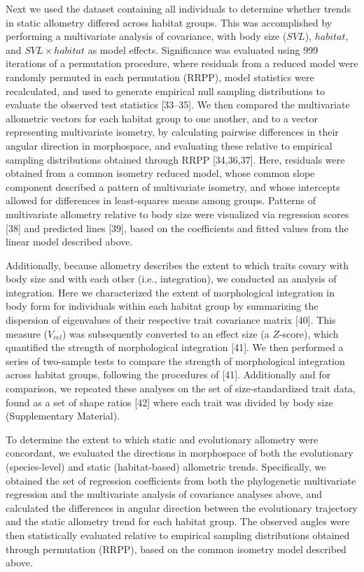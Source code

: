 \documentclass[
  11pt,
]{article}
\begin{document}
Next we used the dataset containing all individuals to determine whether
trends in static allometry differed across habitat groups. This was
accomplished by performing a multivariate analysis of covariance, with
body size (\(SVL\)), \(habitat\), and \(SVL \times habitat\) as model
effects. Significance was evaluated using 999 iterations of a
permutation procedure, where residuals from a reduced model were
randomly permuted in each permutation (RRPP), model statistics were
recalculated, and used to generate empirical null sampling distributions
to evaluate the observed test statistics {[}33--35{]}. We then compared
the multivariate allometric vectors for each habitat group to one
another, and to a vector representing multivariate isometry, by
calculating pairwise differences in their angular direction in
morphospace, and evaluating these relative to empirical sampling
distributions obtained through RRPP {[}34,36,37{]}. Here, residuals were
obtained from a common isometry reduced model, whose common slope
component described a pattern of multivariate isometry, and whose
intercepts allowed for differences in least-squares means among groups.
Patterns of multivariate allometry relative to body size were visualized
via regression scores {[}38{]} and predicted lines {[}39{]}, based on
the coefficients and fitted values from the linear model described
above. \hfill\break

Additionally, because allometry describes the extent to which traits
covary with body size and with each other (i.e., integration), we
conducted an analysis of integration. Here we characterized the extent
of morphological integration in body form for individuals within each
habitat group by summarizing the dispersion of eigenvalues of their
respective trait covariance matrix {[}40{]}. This measure (\(V_{rel}\))
was subsequently converted to an effect size (a \(Z\)-score), which
quantified the strength of morphological integration {[}41{]}. We then
performed a series of two-sample tests to compare the strength of
morphological integration across habitat groups, following the
procedures of {[}41{]}. Additionally and for comparison, we repeated
these analyses on the set of size-standardized trait data, found as a
set of shape ratios {[}42{]} where each trait was divided by body size
(Supplementary Material). \hfill\break

To determine the extent to which static and evolutionary allometry were
concordant, we evaluated the directions in morphospace of both the
evolutionary (species-level) and static (habitat-based) allometric
trends. Specifically, we obtained the set of regression coefficients
from both the phylogenetic multivariate regression and the multivariate
analysis of covariance analyses above, and calculated the differences in
angular direction between the evolutionary trajectory and the static
allometry trend for each habitat group. The observed angles were then
statistically evaluated relative to empirical sampling distributions
obtained through permutation (RRPP), based on the common isometry model
described above. \hfill\break
\end{document}
